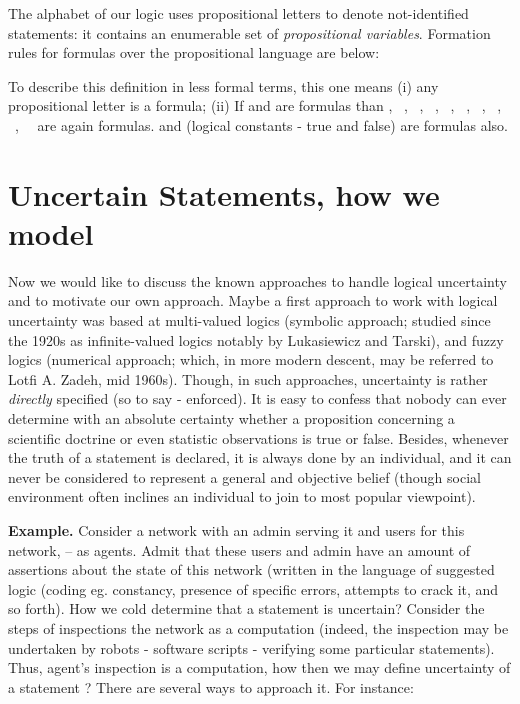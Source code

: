 \documentclass[runningheads]{llncs}
\begin{document}
The alphabet of our logic uses propositional letters to denote not-identified statements: it  contains an enumerable set
  of
 \emph{propositional variables}.
Formation rules for
 formulas over the propositional language 
are below:


  

To describe this definition in less formal terms, this one means
(i) any propositional letter  is a formula;
(ii) If  and  are formulas than
, \
, \
, \
    , \
    , \
    , \
  , \
    , \
    , \
     \
    are again formulas.   and  (logical constants - true and false)
    are  formulas also.

\medskip

\section{Uncertain Statements, how we model}


 Now we would like to discuss the known approaches to handle logical uncertainty and to motivate our own approach. Maybe  a first approach to work with logical uncertainty was
 based at multi-valued logics (symbolic approach; studied since the 1920s as infinite-valued logics notably by Lukasiewicz and Tarski), and fuzzy logics (numerical approach; which, in more modern descent, may be referred to Lotfi A. Zadeh, mid 1960s).
Though, in such approaches, uncertainty is rather {\it directly} specified (so to say - enforced).
It is easy to confess that
 nobody can ever determine with an absolute certainty whether a proposition
 concerning a scientific doctrine or even statistic observations
   is true or false. Besides, whenever the truth of a statement is declared, it is always done by an individual,
   and it can never be considered to represent a general and objective belief (though social environment often inclines an individual to join to most popular
 viewpoint).
 
 \medskip
 
 {\bf Example.} Consider a network with an admin serving it and users for this network, -- as agents.
 Admit that these users and admin have an amount of assertions  about the state of this network
 (written in the language of suggested logic (coding eg. constancy, presence of specific errors, attempts to crack it, and so forth). How we cold determine that a statement  is uncertain?
 Consider the steps of inspections the network as a computation
 (indeed, the inspection may be undertaken by robots - software scripts - verifying some
 particular statements). Thus, agent's inspection is a computation, how then we may define uncertainty of 
 a statement ?  There are several ways to approach it.
 For instance:
 
\end{document}
